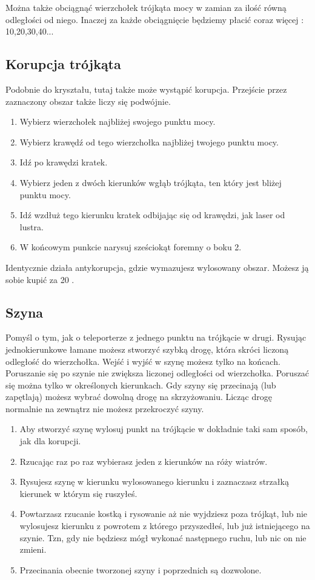 Można także obciągnąć wierzchołek trójkąta mocy w zamian za ilość \xpmcn{} równą odległości od niego. 
Inaczej za każde obciągnięcie będziemy płacić coraz więcej \xpmcn{}: 10,20,30,40...

\subsection{Korupcja trójkąta}
Podobnie do kryształu, tutaj także może wystąpić korupcja.
Przejście przez zaznaczony obszar także liczy się podwójnie.
\begin{enumerate}
 \item Wybierz wierzchołek najbliżej swojego punktu mocy.
 \item Wybierz krawędź od tego wierzchołka najbliżej twojego punktu mocy.
 \item Idź po krawędzi \dxx{} kratek.
 \item Wybierz jeden z dwóch kierunków wgłąb trójkąta, ten który jest bliżej punktu mocy.
 \item Idź wzdłuż tego kierunku \dxx[5]{} kratek odbijając się od krawędzi, jak laser od lustra.
 \item W końcowym punkcie narysuj sześciokąt foremny o boku 2.
\end{enumerate}
Identycznie działa antykorupcja, gdzie wymazujesz wylosowany obszar. Możesz ją sobie kupić za 20 \xpmcn{}.

\subsection{Szyna}
Pomyśl o tym, jak o teleporterze z jednego punktu na trójkącie w drugi.
Rysując jednokierunkowe łamane możesz stworzyć szybką drogę, która skróci liczoną odległość do wierzchołka.
Wejść i wyjść w szynę możesz tylko na końcach.
Poruszanie się po szynie nie zwiększa liczonej odległości od wierzchołka.
Poruszać się można tylko w określonych kierunkach.
Gdy szyny się przecinają (lub zapętlają) możesz wybrać dowolną drogę na skrzyżowaniu.
Licząc drogę normalnie na zewnątrz nie możesz przekroczyć szyny.

\begin{enumerate}
 \item Aby stworzyć szynę wylosuj punkt na trójkącie w dokładnie taki sam sposób, jak dla korupcji.
 \item Rzucając raz po raz \dvi{} wybierasz jeden z kierunków na róży wiatrów. 
 \item Rysujesz szynę w kierunku wylosowanego kierunku i zaznaczasz strzałką kierunek w którym się ruszyłeś.
 \item Powtarzasz rzucanie kostką i rysowanie aż nie wyjdziesz poza trójkąt, lub nie wylosujesz kierunku z powrotem z którego przyszedłeś, lub już istniejącego na szynie. Tzn, gdy nie będziesz mógł wykonać następnego ruchu, lub nic on nie zmieni.
 \item Przecinania obecnie tworzonej szyny i poprzednich są dozwolone.
\end{enumerate}


